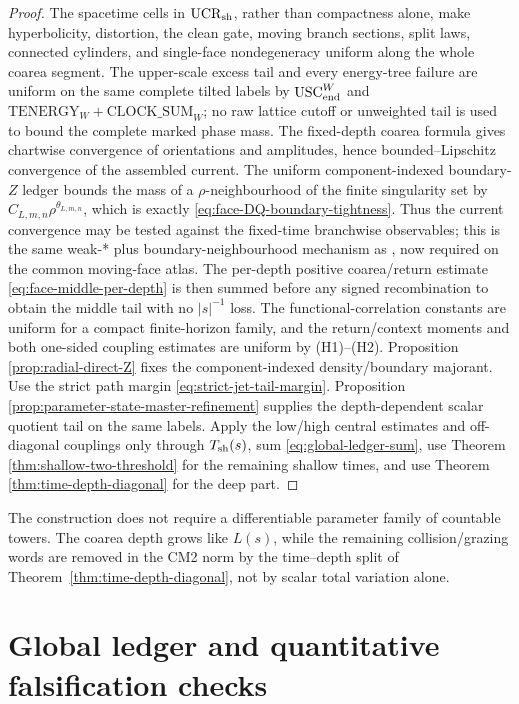 \documentclass[11pt]{article}
\begin{document}
\begin{proof}
The spacetime cells in $\mathrm{UCR}_{\rm sh}$, rather than compactness alone, make
hyperbolicity, distortion, the clean gate, moving branch sections, split
laws, connected cylinders, and single-face nondegeneracy uniform along the
whole coarea segment.  The
upper-scale excess tail and every energy-tree failure are uniform on the
same complete tilted labels by $\mathrm{USC}_{\rm end}^{W}$ and
$\mathrm{TENERGY}_{W}+\mathrm{CLOCK\_SUM}_{W}$; no raw lattice cutoff or unweighted tail is used to
bound the complete marked phase mass.  The
fixed-depth coarea formula gives chartwise convergence of orientations and
amplitudes, hence bounded--Lipschitz convergence of the assembled current.
The uniform component-indexed boundary-$Z$ ledger bounds the mass of a
$\rho$-neighbourhood of the finite singularity set by
$C_{L,m,n}\rho^{\theta_{L,m,n}}$, which is exactly
\eqref{eq:face-DQ-boundary-tightness}.  Thus the current convergence may be
tested against the fixed-time branchwise observables; this is the same
weak-* plus boundary-neighbourhood mechanism as
\cite[Lemma~5.4]{CanestrariHoles}, now required on the common moving-face
atlas.  The per-depth positive coarea/return estimate
\eqref{eq:face-middle-per-depth} is then summed before any signed
recombination to obtain the middle tail with no $|s|^{-1}$ loss.  The
functional-correlation constants are uniform for a compact finite-horizon
family, and the return/context moments and both one-sided coupling estimates
are uniform by \textup{(H1)--(H2)}.  Proposition
\ref{prop:radial-direct-Z} fixes the component-indexed density/boundary
majorant.  Use the strict path margin
\eqref{eq:strict-jet-tail-margin}.  Proposition
\ref{prop:parameter-state-master-refinement} supplies the
depth-dependent scalar quotient tail on the same labels.  Apply the low/high
central estimates and off-diagonal couplings only through $T_{\rm sh}(s)$,
sum \eqref{eq:global-ledger-sum}, use Theorem
\ref{thm:shallow-two-threshold} for the remaining shallow times, and use Theorem
\ref{thm:time-depth-diagonal} for the deep part.
\end{proof}

The construction does not require a differentiable parameter family of
countable towers.  The coarea depth grows like $L(s)$, while the remaining
collision/grazing words are removed in the CM2 norm by the time--depth split
of Theorem~\ref{thm:time-depth-diagonal}, not by scalar total variation alone.

\section{Global ledger and quantitative falsification checks}
\end{document}
